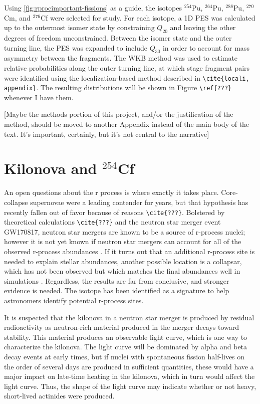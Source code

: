 Using \ref{fig:rprocimportant-fissions} as a guide, the isotopes $^{254}$Pu, $^{264}$Pu, $^{288}$Pu, $^{270}$Cm, and $^{276}$Cf were selected for study. For each isotope, a 1D PES was calculated up to the outermost isomer state by constraining $Q_{20}$ and leaving the other degrees of freedom unconstrained. Between the isomer state and the outer turning line, the PES was expanded to include $Q_{30}$ in order to account for mass asymmetry between the fragments. The WKB method was used to estimate relative probabilities along the outer turning line, at which stage fragment pairs were identified using the localization-based method described in \verb|\cite{locali, appendix}|. The resulting distributions will be shown in Figure \verb|\ref{???}| whenever I have them.

[Maybe the methods portion of this project, and/or the justification of the method, should be moved to another Appendix instead of the main body of the text. It's important, certainly, but it's not central to the narrative]

\section{Kilonova and $^{254}$Cf}

An open questions about the r process is where exactly it takes place. Core-collapse supernovae were a leading contender for years, but that hypothesis has recently fallen out of favor because of reasons \verb|\cite{???}|. Bolstered by theoretical calculations \verb|\cite{???}| and the neutron star merger event GW170817, neutron star mergers are known to be a source of r-process nuclei; however it is not yet known if neutron star mergers can account for all of the observed r-process abundances \cite{Pian2017,Kasen2017}. If it turns out that an additional r-process site is needed to explain stellar abundances, another possible location is a collapsar, which has not been observed but which matches the final abundances well in simulations \cite{Nakamura2013,Siegel2018}. Regardless, the results are far from conclusive, and stronger evidence is needed. The isotope {\Cf} has been identified as a signature to help astronomers identify potential r-process sites.

It is suspected that the kilonova in a neutron star merger is produced by residual radioactivity as neutron-rich material produced in the merger decays toward stability. This material produces an observable light curve, which is one way to characterize the kilonova. The light curve will be dominated by alpha and beta decay events at early times, but if nuclei with spontaneous fission half-lives on the order of several days are produced in sufficient quantities, these would have a major impact on late-time heating in the kilonova, which in turn would affect the light curve. Thus, the shape of the light curve may indicate whether or not heavy, short-lived actinides were produced.

